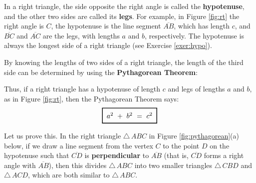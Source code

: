 \divider
\newpage
\piccaption[]{\label{fig:rt}}
In a right triangle, the side opposite the right angle is called the
\textbf{hypotenuse}, and the other two sides are called its
\textbf{legs}. For example, in Figure \ref{fig:rt} the right angle
is $C$, the hypotenuse is the line segment $\overline{AB}$, which has length $c$, and
$\overline{BC}$ and $\overline{AC}$ are the legs, with lengths $a$ and $b$, respectively. The
hypotenuse is always the longest side of a right triangle (see Exercise \ref{exer:hypo}).

By knowing the lengths of two sides of a right triangle, the length of the third side can be
determined by using the \textbf{Pythagorean Theorem}:


Thus, if a right triangle has a hypotenuse of length $c$ and legs of lengths $a$ and $b$, as in
Figure \ref{fig:rt}, then the Pythagorean Theorem says:
\begin{equation}\label{eqn:pythagorean}
 {\setlength\fboxsep{2mm}\setlength\fboxrule{1pt}\fbox{$a^2 ~+~ b^2 ~=~ c^2$}}
\end{equation}

Let us prove this. In the right triangle $\triangle\,ABC$ in Figure \ref{fig:pythagorean}(a) below,
if we draw a line segment from the vertex $C$ to the point $D$ on the hypotenuse such that
$\overline{CD}$ is \textbf{perpendicular} to $\overline{AB}$ (that is,
$\overline{CD}$ forms a right angle with $\overline{AB}$), then this divides $\triangle\,ABC$
into two smaller triangles $\triangle\,CBD$ and $\triangle\,ACD$, which are both similar to
$\triangle\,ABC$.

